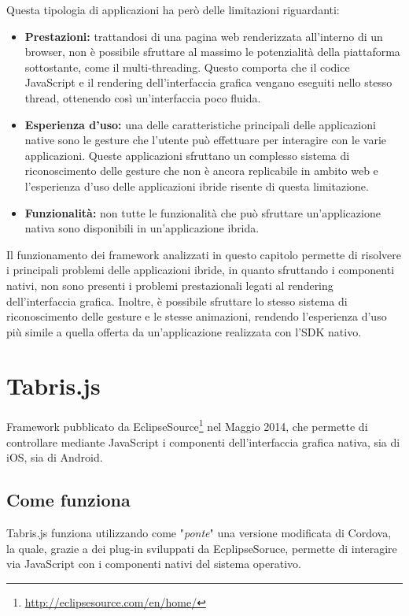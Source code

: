 Questa tipologia di applicazioni ha però delle limitazioni riguardanti:
\begin{itemize}
\item \textbf{Prestazioni:} trattandosi di una pagina web renderizzata all'interno di un browser, non è possibile sfruttare al massimo le potenzialità della piattaforma sottostante, come il multi-threading. Questo comporta che il codice JavaScript e il rendering dell'interfaccia grafica vengano eseguiti nello stesso thread, ottenendo così un'interfaccia poco fluida.
\item \textbf{Esperienza d'uso:} una delle caratteristiche principali delle applicazioni native sono le \gls{gesture} che l'utente può effettuare per interagire con le varie applicazioni. Queste applicazioni sfruttano un complesso sistema di riconoscimento delle gesture che non è ancora replicabile in ambito web e l'esperienza d'uso delle applicazioni ibride risente di questa limitazione.
\item \textbf{Funzionalità:} non tutte le funzionalità che può sfruttare un'applicazione nativa sono disponibili in un'applicazione ibrida.
\end{itemize}
Il funzionamento dei framework analizzati in questo capitolo permette di risolvere i principali problemi delle applicazioni ibride, in quanto sfruttando i componenti nativi, non sono presenti i problemi prestazionali legati al rendering dell'interfaccia grafica.%
Inoltre, è possibile sfruttare lo stesso sistema di riconoscimento delle gesture e le stesse animazioni, rendendo l'esperienza d'uso più simile a quella offerta da un'applicazione realizzata con l'SDK nativo.

\section{Tabris.js}

Framework pubblicato da EclipseSource\footnote{\url{http://eclipsesource.com/en/home/}} nel Maggio 2014, che permette di controllare mediante JavaScript i componenti dell'interfaccia grafica nativa, sia di iOS, sia di Android.

\subsection{Come funziona}
Tabris.js funziona utilizzando come "\textit{ponte}" una versione modificata di Cordova, la quale, grazie a dei plug-in sviluppati da EcplipseSoruce, permette di interagire via JavaScript con i componenti nativi del sistema operativo.

